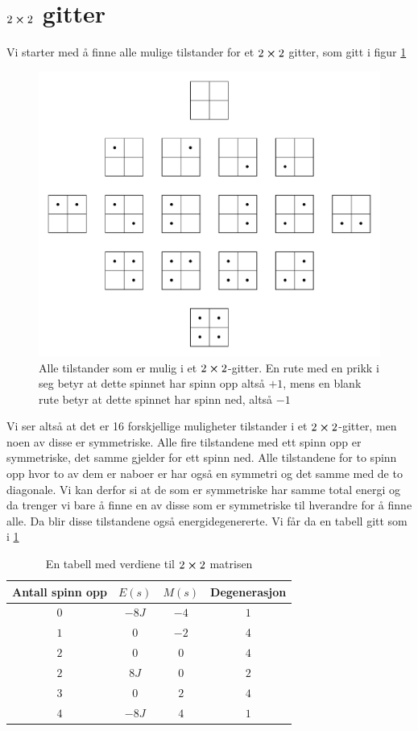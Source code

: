 \documentclass[reprint,english,notitlepage]{revtex4-2}  %
\begin{document}
\newpage
\appendix
\section{$2\cross 2$ gitter}
Vi starter med å finne alle mulige tilstander for et $2\cross 2$ gitter, som gitt i figur \ref{2x2}
\begin{figure}[H]
	\label{2x2}
	\includegraphics[scale=0.5]{Latice.pdf}
	\caption{Alle tilstander som er mulig i et $2\cross2$-gitter. En rute med en prikk i seg betyr at dette spinnet har spinn opp altså $+1$, mens en blank rute betyr at dette spinnet har spinn ned, altså $-1$}
\end{figure}
Vi ser altså at det er 16 forskjellige muligheter tilstander i et $2\cross2$-gitter, men noen av disse er symmetriske. Alle fire tilstandene med ett spinn opp er symmetriske, det samme gjelder for ett spinn ned. Alle tilstandene for to spinn opp hvor to av dem er naboer er har også en symmetri og det samme med de to diagonale. Vi kan derfor si at de som er symmetriske har samme total energi og da trenger vi bare å finne en av disse som er symmetriske til hverandre for å finne alle. Da blir disse tilstandene også energidegenererte. Vi får da en tabell gitt som i \ref{2x2tabell}
\begin{table}[H]
	\begin{tabular}{|c|c|c|c|} %
		\hline                    %
		Antall spinn opp & $E(s)$ & $M(s)$& Degenerasjon  \\
		\hline
		$0$ & $-8J$ & $-4$ & $1$ \\
		\hline
		$1$ & $0$ & $-2$ & 4\\
		\hline
		$2$ &$0$ &$0$ &$4$ \\\hline 
		$2$ &$8J$ &$0$&$2$ \\\hline 
		$3$&$0$&$2$&$4$ \\\hline 
		$4$&$-8J$&$4$&$1$ \\\hline 
	\end{tabular}
\caption{En tabell med verdiene til $2\cross 2$ matrisen}
\label{2x2tabell}
\end{table}
\end{document}

